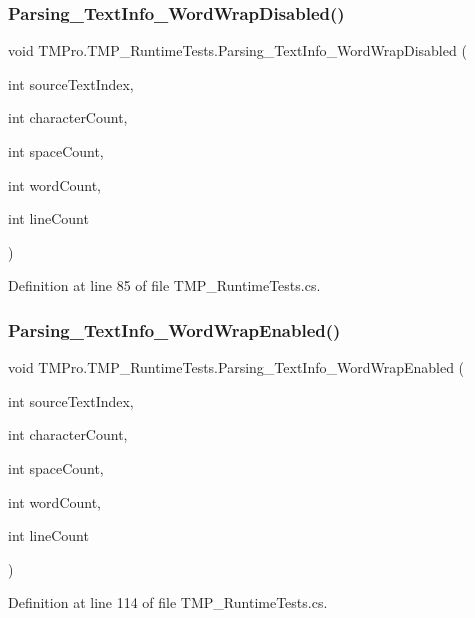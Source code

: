 \subsubsection{\texorpdfstring{Parsing\_TextInfo\_WordWrapDisabled()}{Parsing\_TextInfo\_WordWrapDisabled()}}
{\footnotesize\ttfamily void T\+M\+Pro.\+T\+M\+P\+\_\+\+Runtime\+Tests.\+Parsing\+\_\+\+Text\+Info\+\_\+\+Word\+Wrap\+Disabled (\begin{DoxyParamCaption}\item[{int}]{source\+Text\+Index,  }\item[{int}]{character\+Count,  }\item[{int}]{space\+Count,  }\item[{int}]{word\+Count,  }\item[{int}]{line\+Count }\end{DoxyParamCaption})}



Definition at line 85 of file T\+M\+P\+\_\+\+Runtime\+Tests.\+cs.

\mbox{\label{class_t_m_pro_1_1_t_m_p___runtime_tests_a96aa93e70f25ce98e594b1b8740a49b3}} 
\subsubsection{\texorpdfstring{Parsing\_TextInfo\_WordWrapEnabled()}{Parsing\_TextInfo\_WordWrapEnabled()}}
{\footnotesize\ttfamily void T\+M\+Pro.\+T\+M\+P\+\_\+\+Runtime\+Tests.\+Parsing\+\_\+\+Text\+Info\+\_\+\+Word\+Wrap\+Enabled (\begin{DoxyParamCaption}\item[{int}]{source\+Text\+Index,  }\item[{int}]{character\+Count,  }\item[{int}]{space\+Count,  }\item[{int}]{word\+Count,  }\item[{int}]{line\+Count }\end{DoxyParamCaption})}



Definition at line 114 of file T\+M\+P\+\_\+\+Runtime\+Tests.\+cs.

\mbox{\label{class_t_m_pro_1_1_t_m_p___runtime_tests_a65b1837dfbcfeed261f6e914e69d7255}} 
